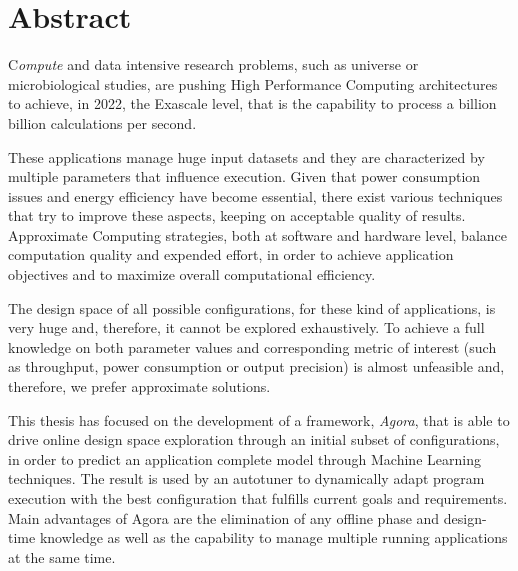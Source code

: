 \chapter*{Abstract}

\lettrine{C}{}\textit{ompute} and data intensive research problems, such as universe or microbiological studies, are pushing High Performance Computing architectures to achieve, in 2022, the Exascale level, that is the capability to process a billion billion calculations per second.

These applications manage huge input datasets and they are characterized by multiple parameters that influence execution. Given that power consumption issues and energy efficiency have become essential, there exist various techniques that try to improve these aspects, keeping on acceptable quality of results. Approximate Computing strategies, both at software and hardware level, balance computation quality and expended effort, in order to achieve application objectives and to maximize overall computational efficiency.

The design space of all possible configurations, for these kind of applications, is very huge and, therefore, it cannot be explored exhaustively. To achieve a full knowledge on both parameter values and corresponding metric of interest (such as throughput, power consumption or output precision) is almost unfeasible and, therefore, we prefer approximate solutions.

This thesis has focused on the development of a framework, \textit{Agora}, that is able to drive online design space exploration through an initial subset of configurations, in order to predict an application complete model through Machine Learning techniques. The result is used by an autotuner to dynamically adapt program execution with the best configuration that fulfills current goals and requirements. Main advantages of Agora are the elimination of any offline phase and design-time knowledge as well as the capability to manage multiple running applications at the same time.
